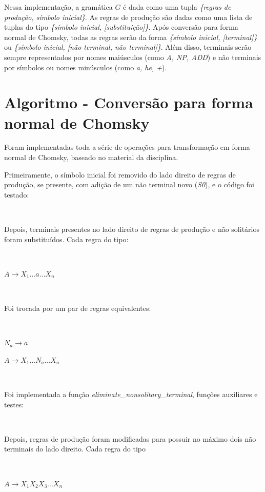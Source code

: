 \documentclass[conference]{IEEEtran}
\begin{document}
Nessa implementação, a gramática $G$ é dada como uma tupla \emph{\{regras de produção, símbolo inicial\}}. As regras de produção são dadas como uma lista de tuplas do tipo \emph{\{símbolo inicial, [substituição]\}}. Após conversão para forma normal de Chomsky, todas as regras serão da forma \emph{\{símbolo inicial, [terminal]\}} ou \emph{\{símbolo inicial, [não terminal, não terminal]\}}. Além disso, terminais serão sempre representados por nomes maiúsculos (como \emph{A, NP, ADD}) e não terminais por símbolos ou nomes minúsculos (como \emph{a, he, +}).

\section{Algoritmo - Conversão para forma normal de Chomsky}

Foram implementadas toda a série de operações para transformação em forma normal de Chomsky, baseado no material da disciplina.

Primeiramente, o símbolo inicial foi removido do lado direito de regras de produção, se presente, com adição de um não terminal novo (\emph{S0}), e o código foi testado:



\



Depois, terminais presentes no lado direito de regras de produção e não solitários foram substituídos. Cada regra do tipo:

\

$A \to X_1 ... a ... X_n$

\

Foi trocada por um par de regras equivalentes:

\

$N_a \to a$

$A \to X_1 ... N_a ... X_n$

\

Foi implementada a função \emph{eliminate\_nonsolitary\_terminal}, funções auxiliares e testes:



\



Depois, regras de produção foram modificadas para possuir no máximo dois não terminais do lado direito. Cada regra do tipo

\

$A \to X_1 X_2 X_3 ... X_n$
\end{document}
